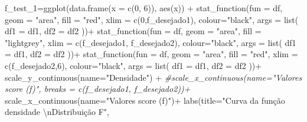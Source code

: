 \documentclass[
]{book}
\newenvironment{Shaded}{\begin{snugshade}}{\end{snugshade}}
\newcommand{\AttributeTok}[1]{\textcolor[rgb]{0.77,0.63,0.00}{#1}}
\newcommand{\CommentTok}[1]{\textcolor[rgb]{0.56,0.35,0.01}{\textit{#1}}}
\newcommand{\DecValTok}[1]{\textcolor[rgb]{0.00,0.00,0.81}{#1}}
\newcommand{\FunctionTok}[1]{\textcolor[rgb]{0.00,0.00,0.00}{#1}}
\newcommand{\NormalTok}[1]{#1}
\newcommand{\OtherTok}[1]{\textcolor[rgb]{0.56,0.35,0.01}{#1}}
\newcommand{\SpecialCharTok}[1]{\textcolor[rgb]{0.00,0.00,0.00}{#1}}
\newcommand{\StringTok}[1]{\textcolor[rgb]{0.31,0.60,0.02}{#1}}
\begin{document}
\begin{Shaded}
\begin{Highlighting}[]
\NormalTok{f\_test\_1}\OtherTok{=}\FunctionTok{ggplot}\NormalTok{(}\FunctionTok{data.frame}\NormalTok{(}\AttributeTok{x =} \FunctionTok{c}\NormalTok{(}\DecValTok{0}\NormalTok{, }\DecValTok{6}\NormalTok{)), }\FunctionTok{aes}\NormalTok{(x)) }\SpecialCharTok{+}
  \FunctionTok{stat\_function}\NormalTok{(}\AttributeTok{fun =}\NormalTok{ df,}
                \AttributeTok{geom =} \StringTok{"area"}\NormalTok{,}
                \AttributeTok{fill =} \StringTok{"red"}\NormalTok{,}
                \AttributeTok{xlim =} \FunctionTok{c}\NormalTok{(}\DecValTok{0}\NormalTok{,f\_desejado1),}
                \AttributeTok{colour=}\StringTok{"black"}\NormalTok{,}
                \AttributeTok{args =} \FunctionTok{list}\NormalTok{(}
                  \AttributeTok{df1 =}\NormalTok{ df1,}
                  \AttributeTok{df2 =}\NormalTok{ df2}
\NormalTok{                ))}\SpecialCharTok{+}
  \FunctionTok{stat\_function}\NormalTok{(}\AttributeTok{fun =}\NormalTok{ df,}
                \AttributeTok{geom =} \StringTok{"area"}\NormalTok{,}
                \AttributeTok{fill =} \StringTok{"lightgrey"}\NormalTok{,}
                \AttributeTok{xlim =} \FunctionTok{c}\NormalTok{(f\_desejado1, f\_desejado2),}
                \AttributeTok{colour=}\StringTok{"black"}\NormalTok{,}
                \AttributeTok{args =} \FunctionTok{list}\NormalTok{(}
                  \AttributeTok{df1 =}\NormalTok{ df1,}
                  \AttributeTok{df2 =}\NormalTok{ df2}
\NormalTok{                ))}\SpecialCharTok{+}
  \FunctionTok{stat\_function}\NormalTok{(}\AttributeTok{fun =}\NormalTok{ df,}
                \AttributeTok{geom =} \StringTok{"area"}\NormalTok{,}
                \AttributeTok{fill =} \StringTok{"red"}\NormalTok{,}
                \AttributeTok{xlim =} \FunctionTok{c}\NormalTok{(f\_desejado2,}\DecValTok{6}\NormalTok{),}
                \AttributeTok{colour=}\StringTok{"black"}\NormalTok{,}
                \AttributeTok{args =} \FunctionTok{list}\NormalTok{(}
                  \AttributeTok{df1 =}\NormalTok{ df1,}
                  \AttributeTok{df2 =}\NormalTok{ df2}
\NormalTok{                ))}\SpecialCharTok{+}
  \FunctionTok{scale\_y\_continuous}\NormalTok{(}\AttributeTok{name=}\StringTok{"Densidade"}\NormalTok{) }\SpecialCharTok{+}
  \CommentTok{\#scale\_x\_continuous(name="Valores score (f)", breaks = c(f\_desejado1, f\_desejado2))+  }
  \FunctionTok{scale\_x\_continuous}\NormalTok{(}\AttributeTok{name=}\StringTok{"Valores score (f)"}\NormalTok{)}\SpecialCharTok{+}  
  \FunctionTok{labs}\NormalTok{(}\AttributeTok{title=}\StringTok{"Curva da função densidade }\SpecialCharTok{\textbackslash{}n}\StringTok{Distribuição F"}\NormalTok{, }

\end{Highlighting}
\end{Shaded}
\end{document}
